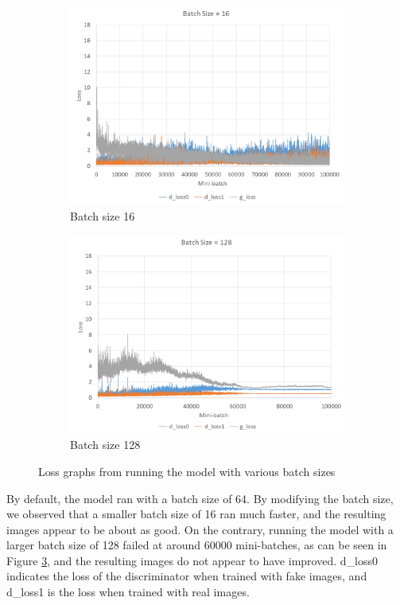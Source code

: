 \documentclass{article} %
\begin{document}
\begin{figure}[h!]
	\centering
	\begin{subfigure}[b]{0.49\linewidth}
		\includegraphics[width=\linewidth]{ijovasev-12-batch-size-16.png}
		\caption{Batch size 16}
		\label{fig:kerasBatchLoss16}
	\end{subfigure}
	\begin{subfigure}[b]{0.49\linewidth}
		\includegraphics[width=\linewidth]{ijovasev-13-batch-size-128.png}
		\caption{Batch size 128}
		\label{fig:kerasBatchLoss128}
	\end{subfigure}
	\caption{Loss graphs from running the model with various batch sizes}
	\label{fig:kerasBatchLoss}
\end{figure}

By default, the model ran with a batch size of 64. By modifying the batch size, we observed that a smaller batch size of 16 ran much faster, and the resulting images appear to be about as good. On the contrary, running the model with a larger batch size of 128 failed at around 60000 mini-batches, as can be seen in Figure \ref{fig:kerasBatchLoss}, and the resulting images do not appear to have improved.  d\_loss0 indicates the loss of the discriminator when trained with fake images, and d\_loss1 is the loss when trained with real images.
\end{document}
